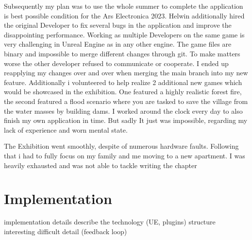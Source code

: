 \documentclass[draft, final]{vutinfth} %
\begin{document}

Subsequently my plan was to use the whole summer to complete the application is best possible condition for the Ars Electronica 2023. Helwin additionally hired the original Developer to fix several bugs in the application and improve the disappointing performance. Working as multiple Developers on the same game is very challenging in Unreal Engine as in any other engine. The game files are binary and impossible to merge different changes through git. To make matters worse the other developer refused to communicate or cooperate. I ended up reapplying my changes over and over when merging the main branch into my new feature. Additionally i volunteered to help realize 2 additional new games which would be showcased in the exhibition. One featured a highly realistic forest fire, the second featured a flood scenario where you are tasked to save the village from the water masses by building dams. I worked around the clock every day to also finish my own application in time. But sadly It just was impossible, regarding my lack of experience and worn mental state.

The Exhibition went smoothly, despite of numerous hardware faults. Following that i had to fully focus on my family and me moving to a new apartment. I was heavily exhausted and was not able to tackle writing the chapter 


\chapter{Implementation}

implementation details
describe the technology (UE, plugins)
structure
interesting difficult detail (feedback loop)
\end{document}

